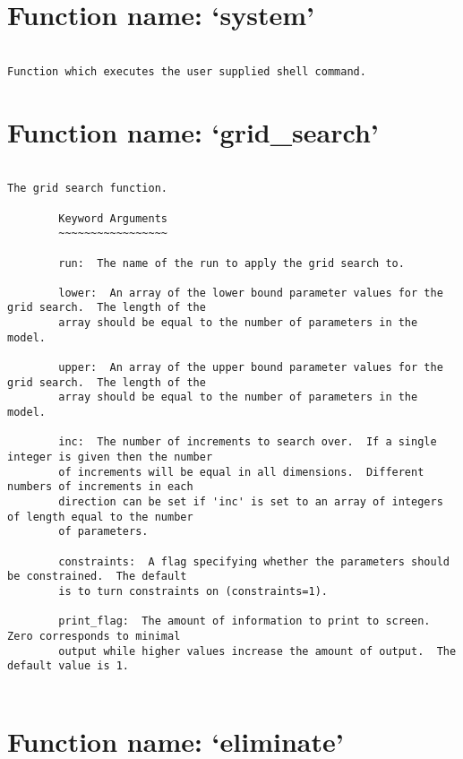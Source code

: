 \normalsize
\section{Function name: `system'}

\scriptsize
\begin{verbatim}

Function which executes the user supplied shell command.
\end{verbatim}

\normalsize
\section{Function name: `grid\_search'}

\scriptsize
\begin{verbatim}

The grid search function.

        Keyword Arguments
        ~~~~~~~~~~~~~~~~~

        run:  The name of the run to apply the grid search to.

        lower:  An array of the lower bound parameter values for the grid search.  The length of the
        array should be equal to the number of parameters in the model.

        upper:  An array of the upper bound parameter values for the grid search.  The length of the
        array should be equal to the number of parameters in the model.

        inc:  The number of increments to search over.  If a single integer is given then the number
        of increments will be equal in all dimensions.  Different numbers of increments in each
        direction can be set if 'inc' is set to an array of integers of length equal to the number
        of parameters.

        constraints:  A flag specifying whether the parameters should be constrained.  The default
        is to turn constraints on (constraints=1).

        print_flag:  The amount of information to print to screen.  Zero corresponds to minimal
        output while higher values increase the amount of output.  The default value is 1.
        
\end{verbatim}

\normalsize
\section{Function name: `eliminate'}


